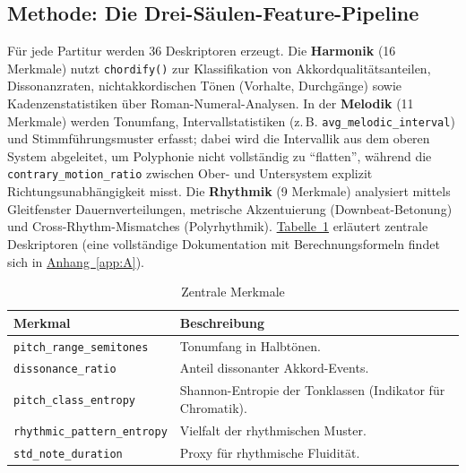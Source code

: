 \documentclass[10pt,a4paper]{article}
\theoremstyle{definition}
\begin{document}
\subsection{Methode: Die Drei-Säulen-Feature-Pipeline}
Für jede Partitur werden 36 Deskriptoren erzeugt. Die \textbf{Harmonik} (16 Merkmale) nutzt \texttt{chordify()} zur Klassifikation von Akkordqualitätsanteilen, Dissonanzraten, nichtakkordischen Tönen (Vorhalte, Durchgänge) sowie Kadenzenstatistiken über Roman-Numeral-Analysen. In der \textbf{Melodik} (11 Merkmale) werden Tonumfang, Intervallstatistiken (z.\,B. \texttt{avg\_melodic\_interval}) und Stimmführungsmuster erfasst; dabei wird die Intervallik aus dem oberen System abgeleitet, um Polyphonie nicht vollständig zu \enquote{flatten}, während die \texttt{contrary\_motion\_ratio} zwischen Ober- und Untersystem explizit Richtungsunabhängigkeit misst. Die \textbf{Rhythmik} (9 Merkmale) analysiert mittels Gleitfenster Dauernverteilungen, metrische Akzentuierung (Downbeat-Betonung) und Cross-Rhythm-Mismatches (Polyrhythmik). \hyperref[tab:features]{Tabelle~\ref*{tab:features}} erläutert zentrale Deskriptoren (eine vollständige Dokumentation mit Berechnungsformeln findet sich in \hyperref[app:A]{Anhang~\ref*{app:A}}).

\begin{table}[H]
    \centering
    \caption{Zentrale Merkmale}\label{tab:features}
    \begin{tabular}{p{5cm}p{9cm}}
        \toprule
        \textbf{Merkmal} & \textbf{Beschreibung} \\
        \midrule
        \texttt{pitch\_range\_semitones} & Tonumfang in Halbtönen. \\
        \texttt{dissonance\_ratio} & Anteil dissonanter Akkord-Events. \\
        \texttt{pitch\_class\_entropy} & Shannon-Entropie der Tonklassen (Indikator für Chromatik). \\
        \texttt{rhythmic\_pattern\_entropy} & Vielfalt der rhythmischen Muster. \\
        \texttt{std\_note\_duration} & Proxy für rhythmische Fluidität. \\
        \bottomrule
    \end{tabular}
\end{table}
\end{document}
